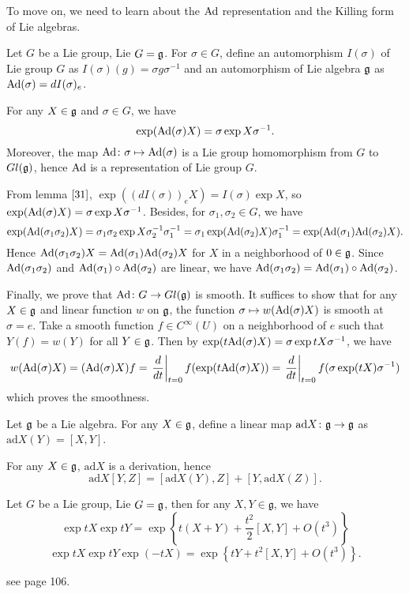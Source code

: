 To move on, we need to learn about the $\mathrm{Ad}$ representation and
the Killing form of Lie algebras.

\begin{definition}
	Let $G$ be a Lie group, Lie $G = {\mathfrak g}$. For $\sigma \in G$,
	define an automorphism $I({\sigma})$ of Lie group $G$ as
	$I(\sigma)(g) = \sigma g\sigma^{-1}$ and an automorphism of
	Lie algebra ${\mathfrak g}$ as $\mathrm{Ad}(\sigma) = dI(\sigma)_e$.
\end{definition}
\begin{theorem}
	For any $X\in {\mathfrak g}$ and $\sigma \in G$, we
	have$$\exp(\mathrm{Ad}(\sigma)X) = \sigma\exp X\sigma^{-1}.$$
	Moreover, the map $\mathrm{Ad}\colon\sigma\mapsto\mathrm{Ad}(\sigma)$ is a Lie
	group homomorphism from $G$ to $Gl({\mathfrak g})$, hence $\mathrm{Ad}$ is a
	representation of Lie group $G$.
\end{theorem}
\bproof
From lemma $\ref{31}$, $\exp((dI(\sigma))_eX) = I(\sigma)\exp X$,
so $\exp(\mathrm{Ad}(\sigma)X) = \sigma\exp X\sigma^{-1}$. Besides, for
$\sigma_1, \sigma_2\in G$, we have
$$\exp(\mathrm{Ad}(\sigma_1\sigma_2)X) = \sigma_1\sigma_2\exp
X\sigma_2^{-1}\sigma_1^{-1} =
\sigma_1\exp(\mathrm{Ad}(\sigma_2)X)\sigma_1^{-1} =
\exp(\mathrm{Ad}(\sigma_1)\mathrm{Ad}(\sigma_2) X).$$
Hence $\mathrm{Ad}(\sigma_1\sigma_2)X = \mathrm{Ad}(\sigma_1)\mathrm{Ad}(\sigma_2) X$ for
$X$ in a neighborhood of $0\in{\mathfrak g}$. Since
$\mathrm{Ad}(\sigma_1\sigma_2)$ and $\mathrm{Ad}(\sigma_1)\circ\mathrm{Ad}(\sigma_2)$ are
linear, we have $\mathrm{Ad}(\sigma_1\sigma_2) =
\mathrm{Ad}(\sigma_1)\circ\mathrm{Ad}(\sigma_2)$. 

Finally, we prove that $\mathrm{Ad}\colon G\to Gl({\mathfrak g})$ is smooth. It
suffices to show that for any $X\in {\mathfrak g}$ and linear function $w$
on ${\mathfrak g}$, the function $\sigma\mapsto w(\mathrm{Ad}(\sigma)X)$ is smooth
at $\sigma=e$. Take a smooth function $f\in C^{\infty}(U)$ on a
neighborhood of $e$ such that $Y(f) = w(Y)$ for all $Y\in {\mathfrak g}$.
Then by $\exp(t\mathrm{Ad}(\sigma)X) = \sigma\exp tX\sigma^{-1}$, we have
$$w(\mathrm{Ad}(\sigma)X) = (\mathrm{Ad}(\sigma)X)f =
\left.\frac{d}{dt}\right|_{t =
0}f(\exp(t\mathrm{Ad}(\sigma)X))=\left.\frac{d}{dt}\right|_{t=0}f(\sigma
\exp(tX)\sigma^{-1})$$
which proves the smoothness.
\eproof

\begin{definition}
	Let ${\mathfrak g}$ be a Lie algebra. For any $X \in {\mathfrak g}$, define a
	linear map $\mathrm{ad}X\colon{\mathfrak g} \to {\mathfrak g}$ as
	$\mathrm{ad}X(Y)=[X,Y]$.
\end{definition}
\begin{theorem}
	For any $X\in{\mathfrak g}$, $\mathrm{ad}X$ is a derivation,
	hence$$\mathrm{ad}X[Y,Z] =
	[\mathrm{ad}X(Y),Z]+[Y,\mathrm{ad}X(Z)].$$
\end{theorem}
\begin{lemma}\label{323}
Let $G$ be a Lie group,  Lie $G={\mathfrak g}$, then for any $X, Y \in
\mathfrak{g}$, we have
\[
	\exp t X \exp t Y = \exp \left\{ t(X+Y)+\frac{t^{2}}{2}[X,
	Y]+O\left(t^{3}\right) \right\}
\]
\[
	\exp t X \exp t Y \exp (-t X) = \exp \left\{ t Y+t^{2}[X,
	Y]+O\left( t^{3} \right) \right\}.
\]	
\end{lemma}
\bproof
see \cite{Hel} page 106.
\eproof


